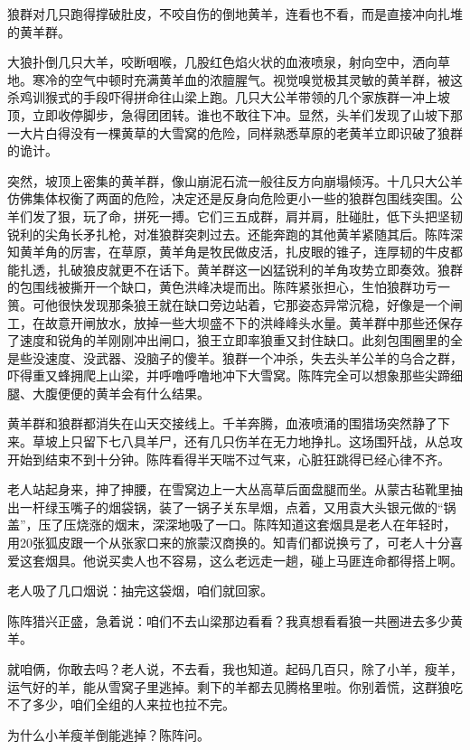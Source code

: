 \par 狼群对几只跑得撑破肚皮，不咬自伤的倒地黄羊，连看也不看，而是直接冲向扎堆的黄羊群。
\par 大狼扑倒几只大羊，咬断咽喉，几股红色焰火状的血液喷泉，射向空中，洒向草地。寒冷的空气中顿时充满黄羊血的浓膻腥气。视觉嗅觉极其灵敏的黄羊群，被这杀鸡训猴式的手段吓得拼命往山梁上跑。几只大公羊带领的几个家族群一冲上坡顶，立即收停脚步，急得团团转。谁也不敢往下冲。显然，头羊们发现了山坡下那一大片白得没有一棵黄草的大雪窝的危险，同样熟悉草原的老黄羊立即识破了狼群的诡计。
\par 突然，坡顶上密集的黄羊群，像山崩泥石流一般往反方向崩塌倾泻。十几只大公羊仿佛集体权衡了两面的危险，决定还是反身向危险更小一些的狼群包围线突围。公羊们发了狠，玩了命，拼死一搏。它们三五成群，肩并肩，肚碰肚，低下头把坚韧锐利的尖角长矛扎枪，对准狼群突刺过去。还能奔跑的其他黄羊紧随其后。陈阵深知黄羊角的厉害，在草原，黄羊角是牧民做皮活，扎皮眼的锥子，连厚韧的牛皮都能扎透，扎破狼皮就更不在话下。黄羊群这一凶猛锐利的羊角攻势立即奏效。狼群的包围线被撕开一个缺口，黄色洪峰决堤而出。陈阵紧张担心，生怕狼群功亏一篑。可他很快发现那条狼王就在缺口旁边站着，它那姿态异常沉稳，好像是一个闸工，在故意开闸放水，放掉一些大坝盛不下的洪峰峰头水量。黄羊群中那些还保存了速度和锐角的羊刚刚冲出闸口，狼王立即率狼重又封住缺口。此刻包围圈里的全是些没速度、没武器、没脑子的傻羊。狼群一个冲杀，失去头羊公羊的乌合之群，吓得重又蜂拥爬上山梁，并呼噜呼噜地冲下大雪窝。陈阵完全可以想象那些尖蹄细腿、大腹便便的黄羊会有什么结果。
\par 黄羊群和狼群都消失在山天交接线上。千羊奔腾，血液喷涌的围猎场突然静了下来。草坡上只留下七八具羊尸，还有几只伤羊在无力地挣扎。这场围歼战，从总攻开始到结束不到十分钟。陈阵看得半天喘不过气来，心脏狂跳得已经心律不齐。
\par 老人站起身来，抻了抻腰，在雪窝边上一大丛高草后面盘腿而坐。从蒙古毡靴里抽出一杆绿玉嘴子的烟袋锅，装了一锅子关东旱烟，点着，又用袁大头银元做的“锅盖”，压了压烧涨的烟末，深深地吸了一口。陈阵知道这套烟具是老人在年轻时，用20张狐皮跟一个从张家口来的旅蒙汉商换的。知青们都说换亏了，可老人十分喜爱这套烟具。他说买卖人也不容易，这么老远走一趟，碰上马匪连命都得搭上啊。
\par 老人吸了几口烟说：抽完这袋烟，咱们就回家。
\par 陈阵猎兴正盛，急着说：咱们不去山梁那边看看？我真想看看狼一共圈进去多少黄羊。
\par 就咱俩，你敢去吗？老人说，不去看，我也知道。起码几百只，除了小羊，瘦羊，运气好的羊，能从雪窝子里逃掉。剩下的羊都去见腾格里啦。你别着慌，这群狼吃不了多少，咱们全组的人来拉也拉不完。
\par 为什么小羊瘦羊倒能逃掉？陈阵问。
